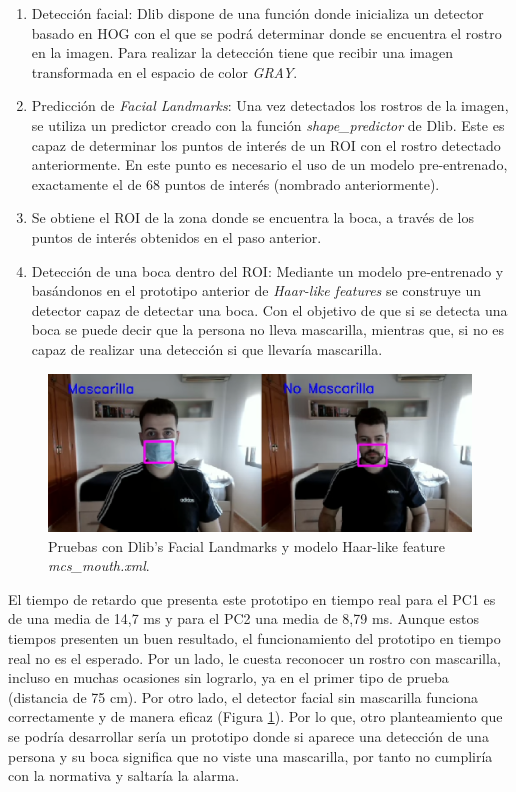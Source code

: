 \begin{enumerate}
	\item Detección facial: Dlib dispone de una función donde inicializa un detector basado en HOG con el que se podrá determinar donde se encuentra el rostro en la imagen. Para realizar la detección tiene que recibir una imagen transformada en el espacio de color \textit{GRAY}.
	\item Predicción de \textit{Facial Landmarks}: Una vez detectados los rostros de la imagen, se utiliza un predictor creado con la función \textit{shape\_predictor} de Dlib. Este es capaz de determinar los puntos de interés de un ROI con el rostro detectado anteriormente. En este punto es necesario el uso de un modelo pre-entrenado, exactamente el de 68 puntos de interés (nombrado anteriormente).
	\item Se obtiene el ROI de la zona donde se encuentra la boca, a través de los puntos de interés obtenidos en el paso anterior.
	\item Detección de una boca dentro del ROI: Mediante un modelo pre-entrenado y basándonos en el prototipo anterior de \textit{Haar-like features} se construye un detector capaz de detectar una boca. Con el objetivo de que si se detecta una boca se puede decir que la persona no lleva mascarilla, mientras que, si no es capaz de realizar una detección si que llevaría mascarilla.
\end{enumerate}

\begin{figure}[htp]
	\centering
	\includegraphics[width=12cm]{imagenes/landmark_prueba.png}
	\caption[Pruebas con Dlib's Facial Landmarks y modelo Haar-like feature \textit{mcs\_mouth}.]{Pruebas con Dlib's Facial Landmarks y modelo Haar-like feature \textit{mcs\_mouth.xml}.}
	\label{fig:dlibLandmarks}
\end{figure}

El tiempo de retardo que presenta este prototipo en tiempo real para el PC1 es de una media de 14,7 ms y para el PC2 una media de 8,79 ms. Aunque estos tiempos presenten un buen resultado, el funcionamiento del prototipo en tiempo real no es el esperado. Por un lado, le cuesta reconocer un rostro con mascarilla, incluso en muchas ocasiones sin lograrlo, ya en el primer tipo de prueba (distancia de 75 cm). Por otro lado, el detector facial sin mascarilla funciona correctamente y de manera eficaz (Figura \ref{fig:dlibLandmarks}). Por lo que, otro planteamiento que se podría desarrollar sería un prototipo donde si aparece una detección de una persona y su boca significa que no viste una mascarilla, por tanto no cumpliría con la normativa y saltaría la alarma.

